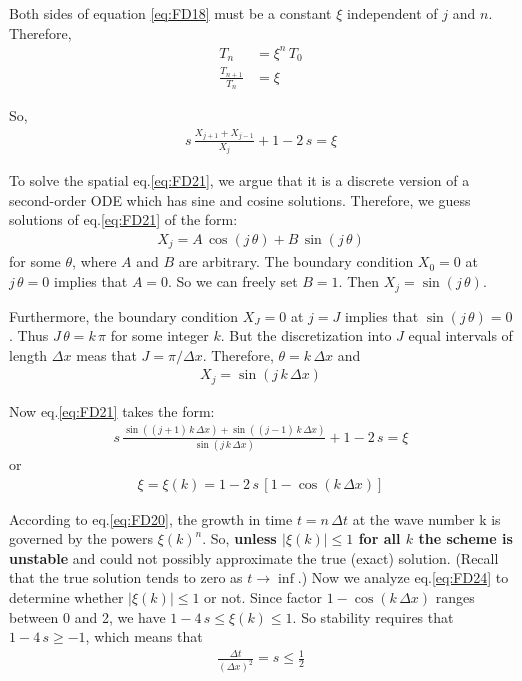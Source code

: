 \documentclass[../main.tex]{subfiles}
\begin{document}
Both sides of equation \ref{eq:FD18} must be a constant $\xi$ independent of $j$ and $n$. Therefore,
\begin{align}
    T_n &= \xi^n \, T_0 \label{eq:FD20} \\
    \frac{T_{n+1}}{T_n} &= \xi \nonumber
\end{align}

So,
\begin{align}
    s \, \frac{X_{j+1} + X_{j-1}}{X_j} + 1 - 2 \, s  = \xi \label{eq:FD21}
\end{align}

To solve the spatial eq.\ref{eq:FD21}, we argue that it is a discrete version of a second-order ODE which has sine and cosine solutions. Therefore, we guess solutions of eq.\ref{eq:FD21} of the form:
\begin{align}
    X_j = A \, \cos{(j \, \theta)} + B \, \sin{(j \, \theta)} \label{eq:FD22}
\end{align}
for some $\theta$, where $A$ and $B$ are arbitrary. The boundary condition $X_0 = 0$ at $j \, \theta= 0$ implies that $A = 0$. So we can freely set $B = 1$. Then $X_j = \sin{(j \, \theta)}$.

Furthermore, the boundary condition $X_J = 0$ at $j = J$ implies that $\sin{(j \, \theta)} = 0$. Thus $J \, \theta = k \, \pi$ for some integer $k$. But the discretization into $J$ equal intervals of length $\Delta x$ meas that $J = \pi / \Delta x$. Therefore, $\theta = k \, \Delta x$ and
\begin{align}
    X_j = \sin{(j \, k \, \Delta x)} \label{eq:FD23}
\end{align}

Now eq.\ref{eq:FD21} takes the form:
\begin{align*}
    s \, \frac{\sin{((j+1) \, k \, \Delta x)} + \sin{((j-1) \, k \, \Delta x)}}{\sin{(j \, k \, \Delta x)}} + 1 - 2 \, s  = \xi \nonumber
\end{align*}
or
\begin{align}
    \xi = \xi(k) = 1 - 2 \, s \, [1 - \cos{(k \, \Delta x)}] \label{eq:FD24}
\end{align}

According to eq.\ref{eq:FD20}, the growth in time $t = n \, \Delta t$ at the wave number k is governed by the powers $\xi(k)^n$. So, \textbf{unless $|\xi(k)| \leqslant 1$ for all $k$ the scheme is unstable} and could not possibly approximate the true (exact) solution. (Recall that the true solution tends to zero as $t \rightarrow \inf$.) Now we analyze eq.\ref{eq:FD24} to determine whether $|\xi(k)| \leqslant 1$ or not. Since factor $1 - \cos{(k \, \Delta x)}$ ranges between 0 and 2, we have $1 - 4 \, s \leqslant \xi(k) \leqslant 1$. So stability requires that $1 - 4 \, s \geqslant - 1$, which means that
\begin{align}
    \frac{\Delta t}{(\Delta x)^2} = s \leqslant \frac{1}{2} \label{eq:FD25}
\end{align}
\end{document}
